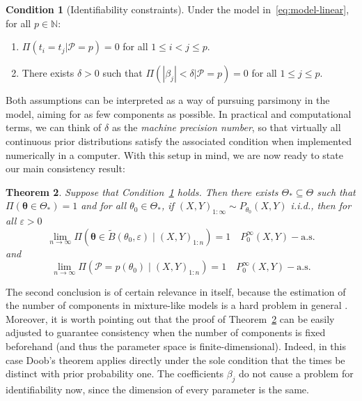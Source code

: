 \documentclass{article}
\numberwithin{equation}{section}
\theoremstyle{plain}
\newtheorem{theorem}{Theorem}
\theoremstyle{definition}
\newtheorem{condition}[theorem]{Condition}
\renewcommand{\epsilon}{\varepsilon}
\newcommand{\N}{\mathbb{N}}
\begin{document}
\begin{condition}[Identifiability constraints] Under the model in~\eqref{eq:model-linear}, for all \(p\in\N\):\label{cond:condition-ident}
  \begin{enumerate}[label=(\roman*)]
    \item \(\Pi(t_i=t_j|\mathcal P=p)=0\) for all \(1\leq i < j \leq p\).\label{cond:condition-ident-1}
    \item There exists \(\delta>0\) such that \(\Pi(|\beta_j|<\delta|\mathcal P=p)=0\) for all \(1\leq j \leq p\).\label{cond:condition-ident-2}
  \end{enumerate}
\end{condition}

Both assumptions can be interpreted as a way of pursuing parsimony in the model, aiming for as few components as possible. In practical and computational terms, we can think of \(\delta\) as the \textit{machine precision number}, so that virtually all continuous prior distributions satisfy the associated condition when implemented numerically in a computer. With this setup in mind, we are now ready to state our main consistency result:

\begin{theorem}\label{th:consistency-theorem}
  Suppose that Condition~\ref{cond:condition-ident} holds. Then there exists \(\Theta_*\subseteq \Theta\) such that \(\Pi(\bm\theta \in \Theta_*)=1\) and for all \(\theta_0\in\Theta_*\), if \((X,Y)_{1:\infty} \sim P_{\theta_0}(X,Y)\) i.i.d., then for all \(\epsilon > 0\)
  \[
    \lim_{n\to\infty} \Pi(\bm \theta \in \tilde{B}(\theta_0,\epsilon) \mid (X,Y)_{1:n}) = 1 \quad P_{0}^\infty(X,Y)-\text{a.s.}
  \]
  and
  \[
    \lim_{n\to\infty} \Pi(\mathcal P=p(\theta_0) \mid (X,Y)_{1:n}) = 1 \quad P_{0}^\infty(X,Y)-\text{a.s.}
  \]
\end{theorem}

The second conclusion is of certain relevance in itself, because the estimation of the number of components in mixture-like models is a hard problem in general \citep[see][and references therein]{miller2018mixture}. Moreover, it is worth pointing out that the proof of Theorem~\ref{th:consistency-theorem} can be easily adjusted to guarantee consistency when the number of components is fixed beforehand (and thus the parameter space is finite-dimensional). Indeed, in this case Doob's theorem applies directly under the sole condition that the times be distinct with prior probability one. The coefficients \(\beta_j\) do not cause a problem for identifiability now, since the dimension of every parameter is the same.
\end{document}
